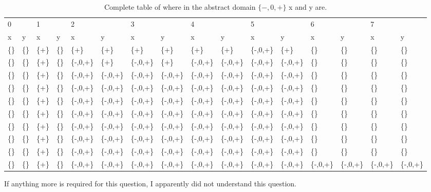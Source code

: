 \documentclass{article}
\begin{document}
	\begin{table}[ht!]
		\caption{Complete table of where in the abstract domain $\{-,0,+\}$ x and y are.}\label{tab:division}
		\hspace*{-2.65cm}\begin{tabular}{l l|l l|l l|l l|l l|l l|l l|l l}
			\rowcolor[gray] {.8}
			0&	&	1&	&	2&	&	3&	&	4&	&	5&	&	6&	&	7& \\	
			x&	y&	x&	y&	x&	y&	x&	y&	x&	y&	x&	y&	x&	y&	x&	y \\
			\{\}&	\{\}&	\{+\}&	\{\}&	\{+\}&	\{+\}&	\{+\}&	\{+\}&	\{+\}&	\{+\}&	\{-,0,+\}&	\{+\}&	\{\}&	\{\}&	\{\}&	\{\}\\
			\{\}&	\{\}&	\{+\}&	\{\}&	\{-,0,+\}&	\{+\}&	\{-,0,+\}&	\{+\}&	\{-,0,+\}&	\{-,0,+\}&	\{-,0,+\}&	\{-,0,+\}&	\{\}&	\{\}&	\{\}&	\{\}\\
			\{\}&	\{\}&	\{+\}&	\{\}&	\{-,0,+\}&	\{-,0,+\}&	\{-,0,+\}&	\{-,0,+\}&	\{-,0,+\}&	\{-,0,+\}&	\{-,0,+\}&	\{-,0,+\}&	\{\}&	\{\}&	\{\}&	\{\}\\
			\{\}&	\{\}&	\{+\}&	\{\}&	\{-,0,+\}&	\{-,0,+\}&	\{-,0,+\}&	\{-,0,+\}&	\{-,0,+\}&	\{-,0,+\}&	\{-,0,+\}&	\{-,0,+\}&	\{\}&	\{\}&	\{\}&	\{\}\\
			\{\}&	\{\}&	\{+\}&	\{\}&	\{-,0,+\}&	\{-,0,+\}&	\{-,0,+\}&	\{-,0,+\}&	\{-,0,+\}&	\{-,0,+\}&	\{-,0,+\}&	\{-,0,+\}&	\{\}&	\{\}&	\{\}&	\{\}\\
			\{\}&	\{\}&	\{+\}&	\{\}&	\{-,0,+\}&	\{-,0,+\}&	\{-,0,+\}&	\{-,0,+\}&	\{-,0,+\}&	\{-,0,+\}&	\{-,0,+\}&	\{-,0,+\}&	\{\}&	\{\}&	\{\}&	\{\}\\
			\{\}&	\{\}&	\{+\}&	\{\}&	\{-,0,+\}&	\{-,0,+\}&	\{-,0,+\}&	\{-,0,+\}&	\{-,0,+\}&	\{-,0,+\}&	\{-,0,+\}&	\{-,0,+\}&	\{\}&	\{\}&	\{\}&	\{\}\\
			\{\}&	\{\}&	\{+\}&	\{\}&	\{-,0,+\}&	\{-,0,+\}&	\{-,0,+\}&	\{-,0,+\}&	\{-,0,+\}&	\{-,0,+\}&	\{-,0,+\}&	\{-,0,+\}&	\{\}&	\{\}&	\{\}&	\{\}\\
			\{\}&	\{\}&	\{+\}&	\{\}&	\{-,0,+\}&	\{-,0,+\}&	\{-,0,+\}&	\{-,0,+\}&	\{-,0,+\}&	\{-,0,+\}&	\{-,0,+\}&	\{-,0,+\}&	\{\}&	\{\}&	\{\}&	\{\}\\
			\{\}&	\{\}&	\{+\}&	\{\}&	\{-,0,+\}&	\{-,0,+\}&	\{-,0,+\}&	\{-,0,+\}&	\{-,0,+\}&	\{-,0,+\}&	\{-,0,+\}&	\{-,0,+\}&	\{-,0,+\}&	\{-,0,+\}&	\{-,0,+\}&	\{-,0,+\}

		\end{tabular}
	\end{table}
	
	
	If anything more is required for this question, I apparently did not understand this question.
	
	
\end{document}

